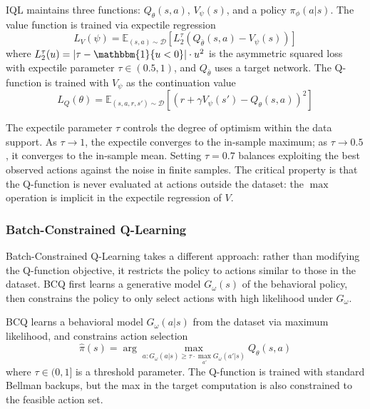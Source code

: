 \begin{definition}
\label{def:iql}
IQL maintains three functions: $Q_\theta(s,a)$, $V_\psi(s)$, and a policy $\pi_\phi(a|s)$. The value function is trained via expectile regression
\begin{equation}
\label{eq:iql_v}
L_V(\psi) = \mathbb{E}_{(s,a) \sim \mathcal{D}}\left[L_2^\tau(Q_{\bar{\theta}}(s,a) - V_\psi(s))\right]
\end{equation}
where $L_2^\tau(u) = |\tau - \mathbbm{1}\{u < 0\}| \cdot u^2$ is the asymmetric squared loss with expectile parameter $\tau \in (0.5, 1)$, and $Q_{\bar{\theta}}$ uses a target network. The Q-function is trained with $V_\psi$ as the continuation value
\begin{equation}
\label{eq:iql_q}
L_Q(\theta) = \mathbb{E}_{(s,a,r,s') \sim \mathcal{D}}\left[(r + \gamma V_\psi(s') - Q_\theta(s,a))^2\right]
\end{equation}
\end{definition}

The expectile parameter $\tau$ controls the degree of optimism within the data support. As $\tau \to 1$, the expectile converges to the in-sample maximum; as $\tau \to 0.5$, it converges to the in-sample mean. Setting $\tau = 0.7$ balances exploiting the best observed actions against the noise in finite samples. The critical property is that the Q-function is never evaluated at actions outside the dataset: the $\max$ operation is implicit in the expectile regression of $V$.

\subsubsection{Batch-Constrained Q-Learning}

Batch-Constrained Q-Learning \citep[BCQ,][]{Fujimoto2019} takes a different approach: rather than modifying the Q-function objective, it restricts the policy to actions similar to those in the dataset. BCQ first learns a generative model $G_\omega(s)$ of the behavioral policy, then constrains the policy to only select actions with high likelihood under $G_\omega$.

\begin{definition}
\label{def:bcq}
BCQ learns a behavioral model $G_\omega(a|s)$ from the dataset via maximum likelihood, and constrains action selection
\begin{equation}
\label{eq:bcq}
\hat{\pi}(s) = \arg\max_{a : G_\omega(a|s) \geq \tau \cdot \max_{a'} G_\omega(a'|s)} Q_\theta(s, a)
\end{equation}
where $\tau \in (0, 1]$ is a threshold parameter. The Q-function is trained with standard Bellman backups, but the max in the target computation is also constrained to the feasible action set.
\end{definition}

